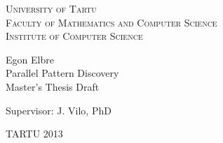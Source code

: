 \begin{titlepage}
\begin{center}

{\scshape
    University of Tartu                  \\[2mm]
    Faculty of Mathematics and Computer Science   \\[3mm]
    Institute of Computer Science
}

  {\Large Egon Elbre } \\[5mm]
  {\Huge  Parallel Pattern Discovery } \\[5mm]
  {\large Master's Thesis Draft}

\begin{flushright}
    {\Large Supervisor: J. Vilo, PhD }
\end{flushright}


{\large TARTU 2013 }

\end{center}
\end{titlepage}
